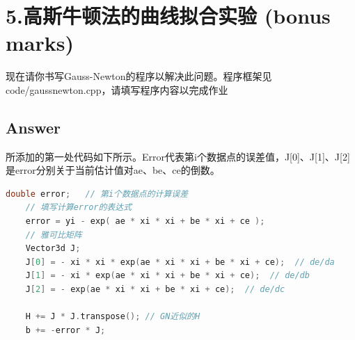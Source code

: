 \documentclass[
	12pt, %
]{fphw} %
\begin{document}
\clearpage
\section*{5.高斯牛顿法的曲线拟合实验 (bonus marks)}

\begin{problem}
	现在请你书写Gauss-Newton的程序以解决此问题。程序框架见code/gaussnewton.cpp，请填写程序内容以完成作业
	

\end{problem}


\subsection*{Answer}

所添加的第一处代码如下所示。Error代表第i个数据点的误差值，J[0]、J[1]、J[2]是error分别关于当前估计值对ae、be、ce的倒数。

\begin{lstlisting}[language=C++, caption=题5所添代码]
	double error;   // 第i个数据点的计算误差
	// 填写计算error的表达式
	error = yi - exp( ae * xi * xi + be * xi + ce );
	// 雅可比矩阵
	Vector3d J; 
	J[0] = - xi * xi * exp(ae * xi * xi + be * xi + ce);  // de/da
	J[1] = - xi * exp(ae * xi * xi + be * xi + ce);  // de/db
	J[2] = - exp(ae * xi * xi + be * xi + ce);  // de/dc
	
	H += J * J.transpose(); // GN近似的H
	b += -error * J;	
\end{lstlisting}
\end{document}
